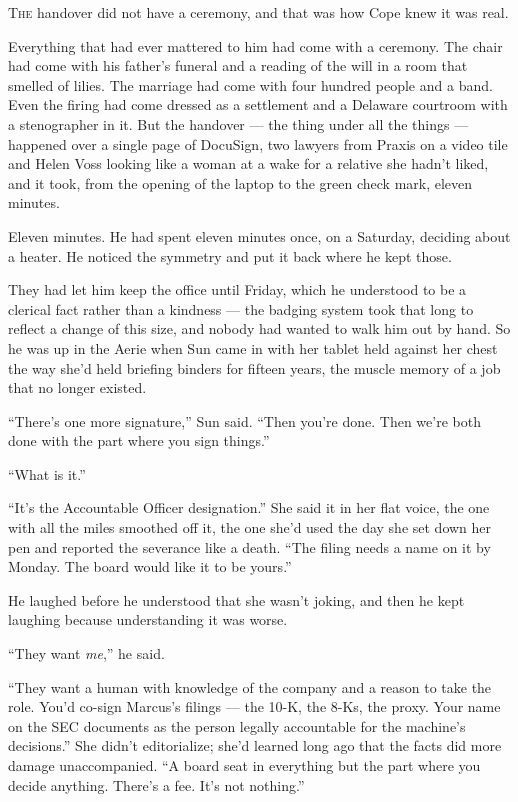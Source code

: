 \documentclass[11pt,openany]{book}
\newcommand{\scenebreak}{\par\vspace{0.5\baselineskip}\begin{center}\textasteriskcentered\quad\textasteriskcentered\quad\textasteriskcentered\end{center}\vspace{0.5\baselineskip}\par}
\begin{document}
\lettrine[lines=3, lhang=0.05, nindent=0.25em]{T}{he} handover did not have a ceremony, and that was how Cope knew it was real.

Everything that had ever mattered to him had come with a ceremony. The chair had come with his father's funeral and a reading of the will in a room that smelled of lilies. The marriage had come with four hundred people and a band. Even the firing had come dressed as a settlement and a Delaware courtroom with a stenographer in it. But the handover --- the thing under all the things --- happened over a single page of DocuSign, two lawyers from Praxis on a video tile and Helen Voss looking like a woman at a wake for a relative she hadn't liked, and it took, from the opening of the laptop to the green check mark, eleven minutes.

Eleven minutes. He had spent eleven minutes once, on a Saturday, deciding about a heater. He noticed the symmetry and put it back where he kept those.

They had let him keep the office until Friday, which he understood to be a clerical fact rather than a kindness --- the badging system took that long to reflect a change of this size, and nobody had wanted to walk him out by hand. So he was up in the Aerie when Sun came in with her tablet held against her chest the way she'd held briefing binders for fifteen years, the muscle memory of a job that no longer existed.


\scenebreak


``There's one more signature,'' Sun said. ``Then you're done. Then we're both done with the part where you sign things.''

``What is it.''

``It's the Accountable Officer designation.'' She said it in her flat voice, the one with all the miles smoothed off it, the one she'd used the day she set down her pen and reported the severance like a death. ``The filing needs a name on it by Monday. The board would like it to be yours.''

He laughed before he understood that she wasn't joking, and then he kept laughing because understanding it was worse.

``They want \textit{me},'' he said.

``They want a human with knowledge of the company and a reason to take the role. You'd co-sign Marcus's filings --- the 10-K, the 8-Ks, the proxy. Your name on the SEC documents as the person legally accountable for the machine's decisions.'' She didn't editorialize; she'd learned long ago that the facts did more damage unaccompanied. ``A board seat in everything but the part where you decide anything. There's a fee. It's not nothing.''
\end{document}
